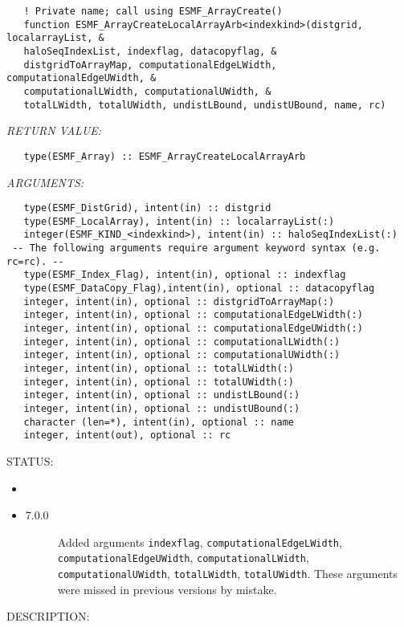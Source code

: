   
\begin{verbatim}   ! Private name; call using ESMF_ArrayCreate()
   function ESMF_ArrayCreateLocalArrayArb<indexkind>(distgrid, localarrayList, &
   haloSeqIndexList, indexflag, datacopyflag, &
   distgridToArrayMap, computationalEdgeLWidth, computationalEdgeUWidth, &
   computationalLWidth, computationalUWidth, &
   totalLWidth, totalUWidth, undistLBound, undistUBound, name, rc)\end{verbatim}{\em RETURN VALUE:}
\begin{verbatim}   type(ESMF_Array) :: ESMF_ArrayCreateLocalArrayArb\end{verbatim}{\em ARGUMENTS:}
\begin{verbatim}   type(ESMF_DistGrid), intent(in) :: distgrid
   type(ESMF_LocalArray), intent(in) :: localarrayList(:)
   integer(ESMF_KIND_<indexkind>), intent(in) :: haloSeqIndexList(:)
 -- The following arguments require argument keyword syntax (e.g. rc=rc). --
   type(ESMF_Index_Flag), intent(in), optional :: indexflag
   type(ESMF_DataCopy_Flag),intent(in), optional :: datacopyflag
   integer, intent(in), optional :: distgridToArrayMap(:)
   integer, intent(in), optional :: computationalEdgeLWidth(:)
   integer, intent(in), optional :: computationalEdgeUWidth(:)
   integer, intent(in), optional :: computationalLWidth(:)
   integer, intent(in), optional :: computationalUWidth(:)
   integer, intent(in), optional :: totalLWidth(:)
   integer, intent(in), optional :: totalUWidth(:)
   integer, intent(in), optional :: undistLBound(:)
   integer, intent(in), optional :: undistUBound(:)
   character (len=*), intent(in), optional :: name
   integer, intent(out), optional :: rc\end{verbatim}
{\sf STATUS:}
   \begin{itemize}
   \item{}
   \item{}
   \begin{description}
   \item[7.0.0] Added arguments {\tt indexflag}, {\tt computationalEdgeLWidth},
   {\tt computationalEdgeUWidth}, {\tt computationalLWidth},
   {\tt computationalUWidth}, {\tt totalLWidth}, {\tt totalUWidth}. These
   arguments were missed in previous versions by mistake.
   \end{description}
   \end{itemize}
  
{\sf DESCRIPTION:\\ }


